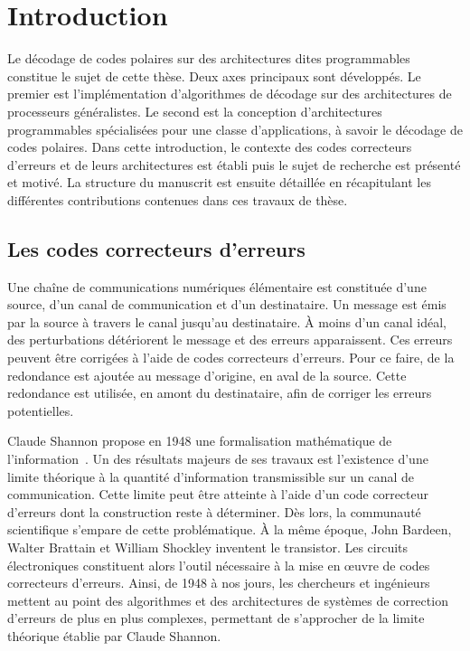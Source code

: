 
{
\chapter*{Introduction}
}
{
\label{sec:Introduction}  %
}


Le décodage de codes polaires sur des architectures dites programmables constitue le sujet de cette thèse. Deux axes principaux sont développés. Le premier est l'implémentation d'algorithmes de décodage sur des architectures de processeurs généralistes. Le second est la conception d'architectures programmables spécialisées pour une classe d'applications, à savoir le décodage de codes polaires. Dans cette introduction, le contexte des codes correcteurs d'erreurs et de leurs architectures est établi puis le sujet de recherche est présenté et motivé. La structure du manuscrit est ensuite détaillée en récapitulant les différentes contributions contenues dans ces travaux de thèse.

\section*{Les codes correcteurs d'erreurs}

Une chaîne de communications numériques élémentaire est constituée d'une source, d'un canal de communication et d'un destinataire. Un message est émis par la source à travers le canal jusqu'au destinataire. \`A moins d'un canal idéal, des perturbations détériorent le message et des erreurs apparaissent. Ces erreurs peuvent être corrigées à l'aide de codes correcteurs d'erreurs. Pour ce faire, de la redondance est ajoutée au message d'origine, en aval de la source. Cette redondance est utilisée, en amont du destinataire, afin de corriger les erreurs potentielles.

Claude Shannon propose en 1948 une formalisation mathématique de l'information~\cite{shannon_mathematical_2001}. Un des résultats majeurs de ses travaux est l’existence d'une limite théorique à la quantité d'information transmissible sur un canal de communication. Cette limite peut être atteinte à l'aide d'un code correcteur d'erreurs dont la construction reste à déterminer.
Dès lors, la communauté scientifique s'empare de cette problématique.
\`A la même époque, John Bardeen, Walter Brattain et William Shockley inventent le transistor. Les circuits électroniques constituent alors l'outil nécessaire à la mise en œuvre de codes correcteurs d'erreurs. Ainsi, de 1948 à nos jours, les chercheurs et ingénieurs mettent au point des algorithmes et des architectures de systèmes de correction d'erreurs de plus en plus complexes, permettant de s'approcher de la limite théorique établie par Claude Shannon.

